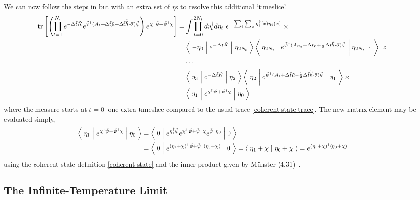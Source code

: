 We can now follow the steps in  but with an extra set of $\eta$s to resolve this additional `timeslice'.
\begin{align}
	\text{tr}\left[\left(\prod_{t=1}^{N_t} e^{-\Delta \tilde{t}\tilde{K}}  e^{ \tilde{\psi}{}^{\dagger} (A_t + \Delta\tilde{t} \tilde{\mu} + \Delta\tilde{t}\tilde{\vec{h}}\cdot\vec{\sigma}) \tilde{\psi} }\right) e^{\chi{}^{\dagger} \tilde{\psi} + \tilde{\psi}{}^{\dagger} \chi}\right]
	=& \int \prod_{t=0}^{2N_t} d \eta^{\dagger}_t d\eta_t ~ e^{- \sum_{t}\sum_x \eta^{\dagger}_t(x) \eta_t(x)}~ \times
	\nonumber\\
	&
		\left\langle\; -\eta_0 \;\middle|\; e^{-\Delta \tilde{t}\tilde{K} }\;\middle|\;\eta_{2 N_t}\;\right\rangle
		\left\langle\; \eta_{2 N_t} \;\middle|\; e^{ \tilde{\psi}{}^{\dagger} (A_{N_t} + \Delta\tilde{t}\tilde{\mu} + \frac{1}{2} \Delta\tilde{t}\tilde{\vec{h}}\cdot\vec{\sigma})\tilde{\psi} } \;\middle|\;\eta_{2 N_t-1}\;\right\rangle ~ \times
	\nonumber\\
	&
		\cdots
	\nonumber\\
	&
		\left\langle\; \eta_3 \;\middle|\; e^{-\Delta \tilde{t}\tilde{K} }\;\middle|\;\eta_{2}\;\right\rangle
		\left\langle\; \eta_2 \;\middle|\; e^{ \tilde{\psi}{}^{\dagger} (A_{1} + \Delta\tilde{t}\tilde{\mu} + \frac{1}{2} \Delta\tilde{t}\tilde{\vec{h}}\cdot\vec{\sigma}) \tilde{\psi}} \;\middle|\;\eta_1\;\right\rangle \times
	\nonumber\\
	&
		\left\langle\; \eta_1 \;\middle|\; e^{\chi{}^{\dagger} \tilde{\psi} + \tilde{\psi}{}^{\dagger} \chi} \;\middle|\; \eta_0 \;\right\rangle
\end{align}
where the measure starts at $t=0$, one extra timeslice compared to the usual trace \eqref{coherent state trace}.
The new matrix element may be evaluated simply,
\begin{align}
	\left\langle\; \eta_1 \;\middle|\; e^{\chi{}^{\dagger} \tilde{\psi} + \tilde{\psi}{}^{\dagger} \chi} \;\middle|\; \eta_0 \;\right\rangle
	&=
	\left\langle\; 0 \;\middle|\; e^{\eta{}^{\dagger}_1 \tilde{\psi}} e^{\chi{}^{\dagger} \tilde{\psi} + \tilde{\psi}{}^{\dagger} \chi} e^{\tilde{\psi}{}^{\dagger} \eta_0}\;\middle|\; 0 \;\right\rangle
	\nonumber\\
	&=
	\left\langle\; 0 \;\middle|\; e^{(\eta_1+\chi){}^{\dagger} \tilde{\psi} + \tilde{\psi}{}^{\dagger} (\eta_0 + \chi)} \;\middle|\; 0 \;\right\rangle
	=
	\left\langle\;\eta_1 + \chi\;\middle|\;\eta_0 + \chi\;\right\rangle
	=
	e^{(\eta_1+\chi){}^{\dagger} (\eta_0+\chi)}
\end{align}
using the coherent state definition \eqref{coherent state} and the inner product given by M\"{u}nster (4.31)~\cite{munster}.

\subsection{The Infinite-Temperature Limit}\label{sec:infinite temperature}

